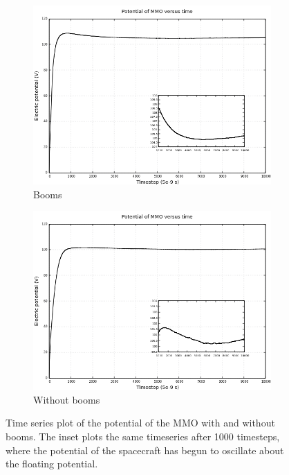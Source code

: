 \begin{center}
    \begin{figure}[H]
      \begin{subfigure}[b]{0.75\textwidth}
      \includegraphics[width=\columnwidth]{figures/MMO/plusX/Booms/MMO_Booms_driftplusX_timeseries.png}
      \caption{Booms}
      \label{fig:MMO_Booms_driftplusX_timeseries}
    \end{subfigure}
    \par\bigskip
    \begin{subfigure}[b]{0.75\textwidth}
      \includegraphics[width=\columnwidth]{figures/MMO/plusX/noBooms/MMO_noBooms_driftplusX_timeseries.png}
      \caption{Without booms}
      \label{fig:MMO_noBooms_driftplusX_timeseries}
    \end{subfigure}
  \label{fig:DriftPlusXTimeseries}
  \caption{Time series plot of the potential of the MMO with and without booms. The inset plots the same timeseries after 1000 timesteps, where the potential of the spacecraft has begun to oscillate about the floating potential.}
  \end{figure}
\end{center}


